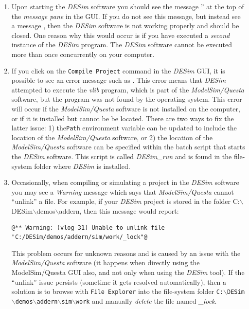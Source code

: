 \begin{enumerate}
\item Upon starting the {\it DESim} software you should see the message 
'' at the top of the {\it message pane} in the GUI. If you do 
not see this message, but instead see a message , then 
the {\it DESim} software is not working properly and should be closed. One
reason why this would occur is if you have executed a {\it second}
instance of the {\it DESim} program. The {\it DESim} software cannot be
executed more than once concurrently on your computer. 

\item If you click on the \texttt{Compile Project} command in the {\it DESim} GUI, it is
possible to see an error message such as 
. This error means that
{\it DESim} attempted to execute the {\it vlib} program, which is part of the 
{\it ModelSim/Questa} software, but the program was not found by the
operating system. This error will occur if the {\it ModelSim/Questa} software is not installed 
on the computer, or if it is installed but cannot be be located. There are two ways to fix the
latter issue: 1) the\texttt{Path} environment variable can be 
updated to include the location of the {\it ModelSim/Questa} software, or 2) the location of the
{\it ModelSim/Questa} software can be specified within the batch script that starts
the {\it DESim} software. This script is called {\it DESim\_run} and is found
in the file-system folder where {\it DESim} is installed. 

\item Occasionally, when compiling or simulating a project in the {\it DESim} software you may
see a {\it Warning} message which says that {\it ModelSim/Questa} cannot ``unlink'' a file. 
For example, if your {\it DESim} project is stored in the folder
C:$\backslash$DESim$\backslash$demos$\backslash$addern, then this message would report: 

\noindent
\begin{minipage}[h]{18 cm}
\begin{lstlisting}[]
@** Warning: (vlog-31) Unable to unlink file "C:/DESim/demos/addern/sim/work/_lock"@
\end{lstlisting}
\end{minipage}

This problem occurs for unknown reasons and is caused by an issue with the
{\it ModelSim/Questa} software (it happens when directly using the ModelSim/Questa GUI
also, and not only when using the {\it DESim} tool). If the ``unlink'' issue
persists (sometime it gets resolved automatically), then a
solution is to browse with \texttt{File Explorer} into the file-system folder  
\texttt{C:$\backslash$DESim$\backslash$demos$\backslash$addern$\backslash$sim$\backslash$work}
and manually {\it delete} the file named {\it \_lock}.


\end{enumerate}
